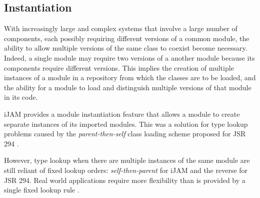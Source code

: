 \subsection{Instantiation}
With increasingly large and complex systems that involve a large number of components,
each possibly requiring different versions of a common module,
the ability to allow multiple versions of the same class to coexist become necessary.
Indeed, a single module may require two versions of a another module because its
components require different versions. This implies the creation of multiple instances 
of a module in a repository from which the classes are to be loaded, and the ability
for a module to load and distinguish multiple versions of that module in its code.

iJAM \cite{iJAM} provides a module instantiation feature that allows a module to create
separate instances of its imported modules. This was a solution for type lookup
problems caused by the {\it parent-then-self} class loading scheme proposed for
JSR 294 \cite{JSR294}.

However, type lookup when there are multiple instances of the same module are still
reliant of fixed lookup orders: {\it self-then-parent} for iJAM and the reverse for JSR 294.
Real world applications require more flexibility than is provided by a single fixed
lookup rule \cite{iJAMComments}.

